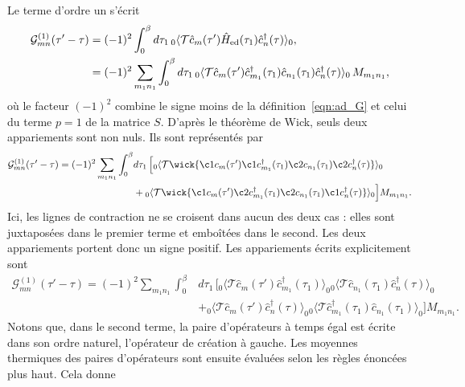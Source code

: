 Le terme d'ordre un s'écrit
\begin{align}
    \mathcal{G}_{mn}^{(1)}(\tau'-\tau) &= (-1)^2\int_0^\beta d\tau_1 \,{}_0\langle\mathcal{T}\hat{c}_m(\tau')\hat{H}_\text{ed}(\tau_1)\hat{c}^\dag_n(\tau)\rangle_0,\notag\\
    &= (-1)^2\sum_{m_1n_1}\int_0^\beta d\tau_1\,{}_0\langle\mathcal{T}\hat{c}_m(\tau')\hat{c}^\dag_{m_1}(\tau_1)\hat{c}_{n_1}(\tau_1)\hat{c}^\dag_n(\tau)\rangle_0\,M_{m_1n_1},
\end{align}
où le facteur $(-1)^2$ combine le signe moins de la définition~\eqref{eqn:ad_G} et celui du terme $p=1$ de la matrice $S$. D'après le théorème de Wick, seuls deux appariements sont non nuls. Ils sont représentés par
\begin{equation}
\begin{aligned}
\mathcal{G}_{mn}^{(1)}(\tau'-\tau)
= (-1)^2 \sum_{m_1n_1} \int_0^\beta &d\tau_1\,
\Big[
    {}_0\langle\mathcal{T}
      \wick{
        \c1 c_{m}(\tau')
        \c1 c_{m_1}^\dag(\tau_1)
        \c2 c_{n_1}(\tau_1)
        \c2 c_{n}^\dag(\tau)
      }\rangle_0
\\
&
    +
    {}_0\langle\mathcal{T}
    \wick{
        \c1 c_{m}(\tau')
        \c2 c_{m_1}^\dag(\tau_1)
        \c2 c_{n_1}(\tau_1)
        \c1 c_{n}^\dag(\tau)
    }\rangle_0
\Big]M_{m_1n_1}.
\end{aligned}
\end{equation}
Ici, les lignes de contraction ne se croisent dans aucun des deux cas : elles sont juxtaposées dans le premier terme et emboîtées dans le second. Les deux appariements portent donc un signe positif. Les appariements écrits explicitement sont
\begin{equation}
\begin{aligned}
\mathcal{G}_{mn}^{(1)}(\tau'-\tau)
= (-1)^2 \sum_{m_1n_1} \int_0^\beta &d\tau_1\,
\Big[
    {}_0\langle\mathcal{T}\hat{c}_{m}(\tau')\hat{c}_{m_1}^\dag(\tau_1)
      \rangle_0
      {}_0\langle\mathcal{T}\hat{c}_{n_1}(\tau_1)\hat{c}_{n}^\dag(\tau)
      \rangle_0
\\
&
    +
    {}_0\langle\mathcal{T}\hat{c}_{m}(\tau')\hat{c}_{n}^\dag(\tau)
      \rangle_0
      {}_0\langle\mathcal{T}\hat{c}_{m_1}^\dag(\tau_1)\hat{c}_{n_1}(\tau_1)
      \rangle_0
\Big]M_{m_1n_1}.
\end{aligned}
\end{equation}
Notons que, dans le second terme, la paire d'opérateurs à temps égal est écrite dans son ordre naturel, l'opérateur de création à gauche. Les moyennes thermiques des paires d'opérateurs sont ensuite évaluées selon les règles énoncées plus haut. Cela donne
